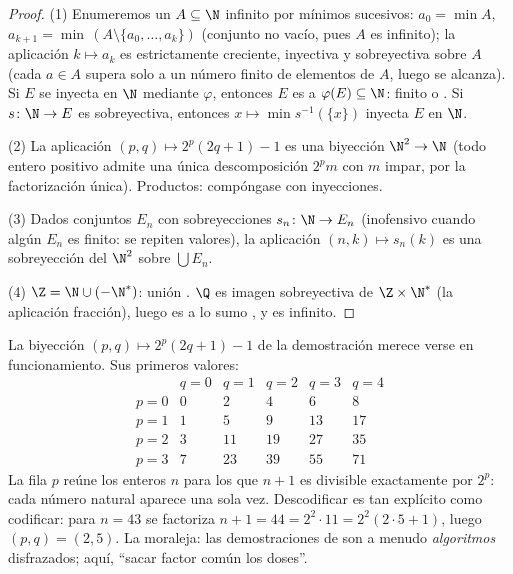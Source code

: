 \begin{proof}
(1) Enumeremos un $A \subseteq \N$ infinito por mínimos sucesivos:
$a_0 = \min A$, $a_{k+1} = \min\,(A \setminus \{a_0, \dots, a_k\})$
(conjunto no vacío, pues $A$ es infinito); la aplicación $k \mapsto
a_k$ es estrictamente creciente, inyectiva y sobreyectiva sobre $A$
(cada $a \in A$ supera solo a un número finito de elementos de $A$,
luego se alcanza). Si $E$ se inyecta en $\N$ mediante $\varphi$,
entonces $E$ es  a $\varphi(E) \subseteq \N$: finito o
. Si $s \colon \N \to E$ es sobreyectiva, entonces $x
\mapsto \min s^{-1}(\{x\})$ inyecta $E$ en $\N$.

(2) La aplicación $(p, q) \mapsto 2^p(2q + 1) - 1$ es una biyección
$\N^2 \to \N$ (todo entero positivo admite una única descomposición
$2^p m$ con $m$ impar, por la factorización única). Productos:
compóngase con inyecciones.

(3) Dados conjuntos $E_n$ con sobreyecciones $s_n \colon \N \to E_n$
(inofensivo cuando algún $E_n$ es finito: se repiten valores), la
aplicación $(n, k) \mapsto s_n(k)$ es una sobreyección del  $\N^2$ sobre $\bigcup E_n$.

(4) $\Z = \N \cup (-\N^*)$: unión . $\Q$ es imagen
sobreyectiva de $\Z \times \N^*$ (la aplicación fracción), luego es a
lo sumo , y es infinito.
\end{proof}

\begin{example}\label{ex:b2:structures:pairing}
La biyección $(p, q) \mapsto 2^p(2q + 1) - 1$ de la demostración
merece verse en funcionamiento. Sus primeros valores:
\[
\begin{array}{c|ccccc}
 & q = 0 & q = 1 & q = 2 & q = 3 & q = 4\\
\hline
p = 0 & 0 & 2 & 4 & 6 & 8\\
p = 1 & 1 & 5 & 9 & 13 & 17\\
p = 2 & 3 & 11 & 19 & 27 & 35\\
p = 3 & 7 & 23 & 39 & 55 & 71
\end{array}
\]
La fila $p$ reúne los enteros $n$ para los que $n + 1$ es
divisible exactamente por $2^p$: cada número natural aparece una
sola vez. Descodificar es tan explícito como codificar: para $n =
43$ se factoriza $n + 1 = 44 = 2^2\cdot 11 = 2^2(2\cdot5 + 1)$,
luego $(p, q) = (2, 5)$. La moraleja: las demostraciones de
 son a menudo
\emph{algoritmos} disfrazados; aquí, ``sacar factor común los
doses''.
\end{example}

